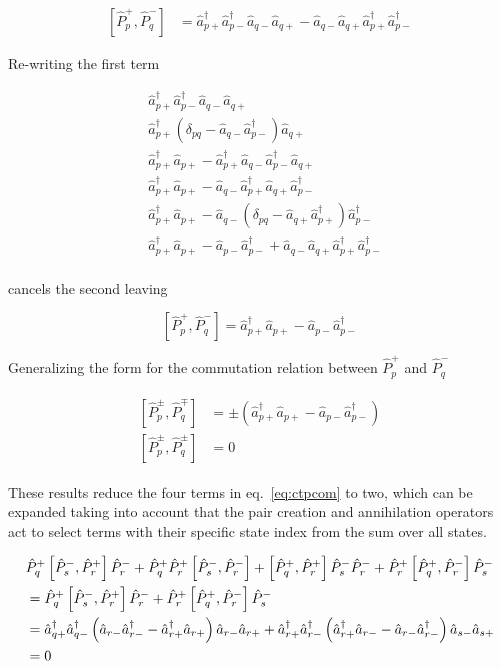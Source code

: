\documentclass[11pt]{article}
\newcommand{\cop}[2]{%
	\ensuremath{ \hat{a} _{#1 #2} ^{\dagger} }}
\newcommand{\aop}[2]{%
	\ensuremath{ \hat{a} _{#1 #2} }}
\newcommand{\pcop}[1]{%
	\ensuremath{ \cop{#1}{+} \cop{#1}{-} } }
\newcommand{\paop}[1]{%
	\ensuremath{ \aop{#1}{-} \aop{#1}{+} } }
\newcommand{\krondelt}[2]{%
	\ensuremath{ \delta _{#1 #2} }}
\newcommand{\ppop}[1]{%
	\ensuremath{ \hat{P} _{#1} ^+ } }
\newcommand{\pmop}[1]{%
	\ensuremath{ \hat{P} _{#1} ^- } }
\newcommand{\commutator}[2]{%
	\ensuremath{ \left [ #1,#2 \right ] }}
\begin{document}
\begin{align*}
	\commutator{\ppop{p}}{\pmop{q}} &= \cop{p}{+} \cop{p}{-} \aop{q}{-} \aop{q}{+} - \aop{q}{-} \aop{q}{+} \cop{p}{+} \cop{p}{-}
\end{align*}

Re-writing the first term

\begin{align*}
	& \cop{p}{+} \cop{p}{-} \aop{q}{-} \aop{q}{+}\\
	& \cop{p}{+} \left ( \krondelt{p}{q} - \aop{q}{-} \cop{p}{-} \right ) \aop{q}{+}\\
	& \cop{p}{+} \aop{p}{+} - \cop{p}{+} \aop{q}{-} \cop{p}{-} \aop{q}{+}\\
	& \cop{p}{+} \aop{p}{+} - \aop{q}{-} \cop{p}{+} \aop{q}{+} \cop{p}{-}\\
	& \cop{p}{+} \aop{p}{+} - \aop{q}{-} \left ( \krondelt{p}{q} - \aop{q}{+} \cop{p}{+} \right ) \cop{p}{-}\\
	& \cop{p}{+} \aop{p}{+} -  \aop{p}{-} \cop{p}{-} + \aop{q}{-} \aop{q}{+} \cop{p}{+} \cop{p}{-}\\
\end{align*}

cancels the second leaving

\begin{equation}
	\commutator{\ppop{p}}{\pmop{q}} = \cop{p}{+} \aop{p}{+} -  \aop{p}{-} \cop{p}{-} \nonumber
\end{equation}

Generalizing the form for the commutation relation between \ppop{p} and \pmop{q}

\begin{align}
\begin{split}
	\commutator{\hat{P} _p ^{\pm} }{\hat{P} _q ^{\mp}} &= \pm ( \cop{p}{+} \aop{p}{+} - \aop{p}{-} \cop{p}{-})\\
	\commutator{\hat{P} _p ^{\pm}}{\hat{P} _q ^{\pm}} &= 0
\end{split}
\label{eq:ppmcom}
\end{align}

These results reduce the four terms in eq.~\ref{eq:ctpcom} to two, which can be expanded taking into account that the pair creation and annihilation operators act to select terms with their specific state index from the sum over all states.

\begin{align*}
	&\ppop{q} \commutator{\pmop{s}}{\ppop{r}} \pmop{r} + \ppop{q} \ppop{r} \commutator{\pmop{s}}{\pmop{r}} + \commutator{\ppop{q}}{\ppop{r}} \pmop{s} \pmop{r} +  \ppop{r} \commutator{\ppop{q}}{\pmop{r}} \pmop{s}\\
	&= \ppop{q} \commutator{\pmop{s}}{\ppop{r}} \pmop{r} +  \ppop{r} \commutator{\ppop{q}}{\pmop{r}} \pmop{s}\\
	&= \pcop{q} \left ( \aop{r}{-} \cop{r}{-} - \cop{r}{+} \aop{r}{+} \right ) \paop{r} + \pcop{r} \left ( \cop{r}{+} \aop{r}{-} - \aop{r}{-} \cop{r}{-} \right ) \paop{s}\\
	&= 0
\end{align*}
\end{document}
